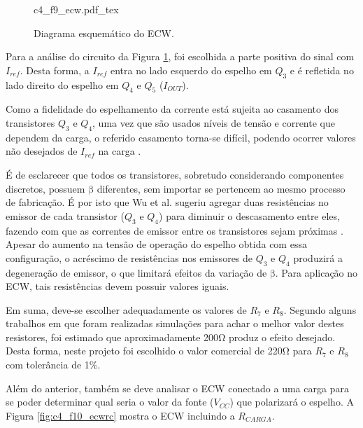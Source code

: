  
\begin{figure}[h]
    \centering %
    \small %
    \def\svgwidth{0.5\columnwidth}%
    {c4_f9_ecw.pdf_tex}
    \caption{Diagrama esquemático do \acrshort{ECW}.}
    \label{fig:c4_f9_ecw}
\end{figure}

Para a análise do circuito da Figura \ref{fig:c4_f9_ecw}, foi escolhida a parte positiva do sinal com $I_{ref}$. Desta forma, a $I_{ref}$ entra no lado esquerdo do espelho em $Q_3$ e é refletida no lado direito do espelho em $Q_4$ e $Q_5$ ($I_{OUT}$).

Como a fidelidade do espelhamento da corrente está sujeita ao casamento dos transistores $Q_3$ e $Q_4$, uma vez que são usados níveis de tensão e corrente que dependem da carga, o referido casamento torna-se difícil, podendo ocorrer valores não desejados de $I_{ref}$ na carga \cite{NacimentoJunqueira2003EletroestimuladorDigital}.

É de esclarecer que todos os transistores, sobretudo considerando componentes discretos, possuem $\mathrm{\beta}$ diferentes, sem importar se pertencem ao mesmo processo de fabricação. É por isto que Wu et al. sugeriu agregar duas resistências no emissor de cada transistor ($Q_3$ e $Q_4$) para diminuir o descasamento entre eles, fazendo com que as correntes de emissor entre os transistores sejam próximas \cite{Wu2002AApplications}. Apesar do aumento na tensão de operação do espelho obtida com essa configuração, o acréscimo de resistências nos emissores de $Q_3$ e $Q_4$ produzirá a degeneração de emissor, o que limitará efeitos da variação de $\mathrm{\beta}$. Para aplicação no \acrshort{ECW}, tais resistências devem possuir valores iguais. 

Em suma, deve-se escolher adequadamente os valores de $R_7$ e $R_8$. Segundo alguns trabalhos \cite{Faria2006ImplementacaoMedulares, Sanches2013SistemaParaplegicos, Wu2002AApplications} em que foram realizadas simulações para achar o melhor valor destes resistores, foi estimado que aproximadamente 200$\mathrm{\Omega}$ produz o efeito desejado. Desta forma, neste projeto foi escolhido o valor comercial de 220$\mathrm{\Omega}$ para $R_7$ e $R_8$ com tolerância de 1\%.

Além do anterior, também se deve analisar o \acrshort{ECW} conectado a uma carga para se poder determinar qual seria o valor da fonte ($V_{CC}$) que polarizará o espelho. A Figura \ref{fig:c4_f10_ecwrc} mostra o \acrshort{ECW} incluindo a $R_{CARGA}$.
 
